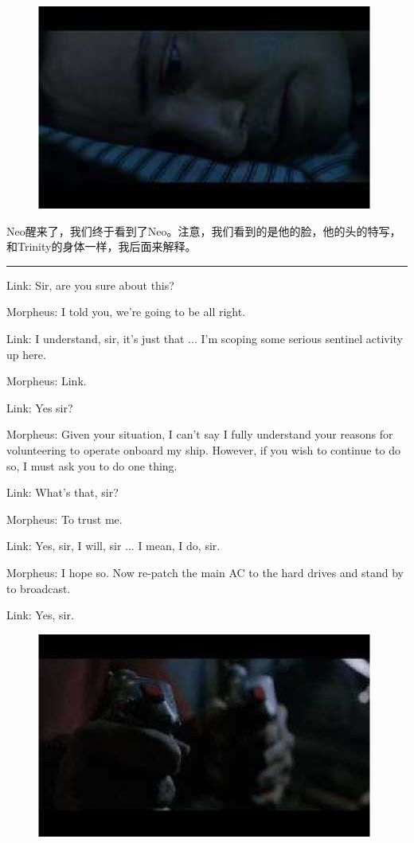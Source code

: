 \documentclass{ctexart}
\newcommand{\myparsep}{\noindent \rule[0.5ex]{\linewidth}{1pt}}
\newenvironment{myquote}{\color{green} \setlength{\leftskip}{6em} \setlength{\rightskip}{4em} \setlength{\parindent}{-2em}}{\par}
\begin{document}
\begin{figure}[htb]
\centering
\includegraphics[width=0.5\linewidth]{fig/read_reloaded-11}
\end{figure}

Neo醒来了，我们终于看到了Neo。注意，我们看到的是他的脸，他的头的特写，和Trinity的身体一样，我后面来解释。

\myparsep

\begin{myquote}
Link: Sir, are you sure about this?

Morpheus: I told you, we're going to be all right.

Link: I understand, sir, it's just that ... I'm scoping some serious sentinel activity up here.

Morpheus: Link.

Link: Yes sir?

Morpheus: Given your situation, I can't say I fully understand your reasons for volunteering to operate onboard my ship. However, if you wish to continue to do so, I must ask you to do one thing.

Link: What's that, sir?

Morpheus: To trust me.

Link: Yes, sir, I will, sir ... I mean, I do, sir.

Morpheus: I hope so. Now re-patch the main AC to the hard drives and stand by to broadcast.

Link: Yes, sir.
\end{myquote}

\begin{figure}[htb]
\centering
\includegraphics[width=0.5\linewidth]{fig/read_reloaded-12}
\end{figure}
\end{document}

